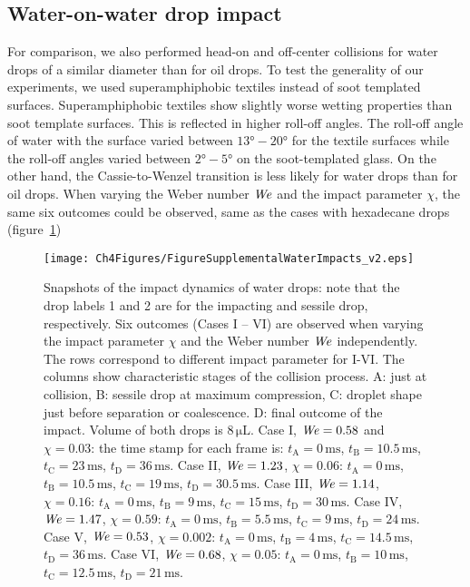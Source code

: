 \begin{subappendices}
	\section{Water-on-water drop impact}
	For comparison, we also performed head-on and off-center collisions for water drops of a similar diameter than for oil drops. To test the generality of our experiments, we used superamphiphobic textiles instead of soot templated surfaces. Superamphiphobic textiles show slightly worse wetting properties than soot template surfaces. This is reflected in higher roll-off angles. The roll-off angle of water with the surface varied between $13\si{\degree} - 20\si{\degree} $ for the textile surfaces while the roll-off angles varied between $2\si{\degree} - 5\si{\degree} $ on the soot-templated glass. On the other hand, the Cassie-to-Wenzel transition is less likely for water drops than for oil drops. When varying the Weber number $\mathit{We}$ and the impact parameter $\chi$, the same six outcomes could be observed, same as the cases with hexadecane drops (figure~\ref{Ch5:FigSwater})
	
	\begin{figure}
		\centering
		\texttt{[image: Ch4Figures/FigureSupplementalWaterImpacts\_v2.eps]}
		\caption{Snapshots of the impact dynamics of water drops: note that the drop labels 1 and 2 are for the impacting and sessile drop, respectively. Six outcomes (Cases I – VI) are observed when varying the impact parameter $\chi$ and the Weber number $\mathit{We}$ independently. The rows correspond to different impact parameter for I-VI. The columns show characteristic stages of the collision process. A: just at collision, B: sessile drop at maximum compression, C: droplet shape just before separation or coalescence. D: final outcome of the impact. Volume of both drops is $8\,\si{\micro\liter}$. Case I, $\mathit{We} = 0.58$ and $\chi = 0.03$: the time stamp for each frame is: $t_{\text{A}} = 0\,\si{\milli\second}$, $t_{\text{B}} = 10.5\,\si{\milli\second}$, $t_{\text{C}} = 23\,\si{\milli\second}$, $t_{\text{D}} = 36\,\si{\milli\second}$. Case II, $\mathit{We} = 1.23$, $\chi = 0.06$: $t_{\text{A}} = 0\,\si{\milli\second}$, $t_{\text{B}} = 10.5\,\si{\milli\second}$, $t_{\text{C}} =19\,\si{\milli\second}$, $t_{\text{D}} = 30.5\,\si{\milli\second}$.  Case III, $\mathit{We} = 1.14$, $\chi = 0.16$: $t_{\text{A}} = 0\,\si{\milli\second}$, $t_{\text{B}} = 9\,\si{\milli\second}$, $t_{\text{C}} = 15\,\si{\milli\second}$, $t_{\text{D}} = 30\,\si{\milli\second}$. Case IV, $\mathit{We} = 1.47$, $\chi = 0.59$: $t_{\text{A}} = 0\,\si{\milli\second}$, $t_{\text{B}} = 5.5\,\si{\milli\second}$, $t_{\text{C}} = 9\,\si{\milli\second}$, $t_{\text{D}} = 24\,\si{\milli\second}$. Case V, $\mathit{We} = 0.53$, $\chi = 0.002$: $t_{\text{A}} = 0\,\si{\milli\second}$, $t_{\text{B}} = 4\,\si{\milli\second}$, $t_{\text{C}} = 14.5\,\si{\milli\second}$, $t_{\text{D}} = 36\,\si{\milli\second}$. Case VI, $\mathit{We} = 0.68$, $\chi = 0.05$: $t_{\text{A}} = 0\,\si{\milli\second}$, $t_{\text{B}} = 10\,\si{\milli\second}$, $t_{\text{C}} = 12.5\,\si{\milli\second}$, $t_{\text{D}} = 21\,\si{\milli\second}$.}
		\label{Ch5:FigSwater}
	\end{figure}


\end{subappendices}
